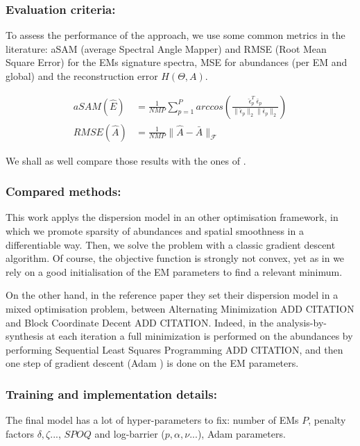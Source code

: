 \documentclass{article}
\begin{document}
\subsubsection{Evaluation criteria:}
To assess the performance of the approach, we use some common metrics in the literature: aSAM (average Spectral Angle Mapper) and RMSE (Root Mean Square Error) for the EMs signature spectra, MSE for abundances (per EM and global) and the reconstruction error $H(\Theta, A)$.

\begin{align*}
  aSAM(\widehat{E}) &= \frac{1}{N M P} \sum_{p=1}^P arccos \left( \frac{\widehat{\epsilon}_p^T\ \bar{\epsilon}_p}{\| \widehat{\epsilon}_p \|_2 \| \bar{\epsilon}_p \|_2} \right)\\
  RMSE(\widehat{A}) &= \frac{1}{N M P} \| \widehat{A} - \bar{A} \|_{\mathcal{F}}
\end{align*}

We shall as well compare those results with the ones of \citet{janiczek_differentiable_2020}.

\subsubsection{Compared methods:}
This work applys the dispersion model in an other optimisation framework, in which we promote sparsity of abundances and spatial smoothness in a differentiable way. Then, we solve the problem with a classic gradient descent algorithm. Of course, the objective function is strongly not convex, yet as in \citet{janiczek_differentiable_2020} we rely on a good initialisation of the EM parameters to find a relevant minimum.

On the other hand, in the reference paper they set their dispersion model in a mixed optimisation problem, between Alternating Minimization ADD CITATION and Block Coordinate Decent ADD CITATION. Indeed, in the analysis-by-synthesis at each iteration a full minimization is performed on the abundances by performing Sequential Least Squares Programming ADD CITATION, and then one step of gradient descent (Adam \citep{kingma_adam_2017}) is done on the EM parameters.

\subsubsection{Training and implementation details:}
The final model has a lot of hyper-parameters to fix: number of EMs $P$, penalty factors $\delta, \zeta...$, $SPOQ$ and log-barrier ($p, \alpha, \nu...$), Adam parameters.
\end{document}
